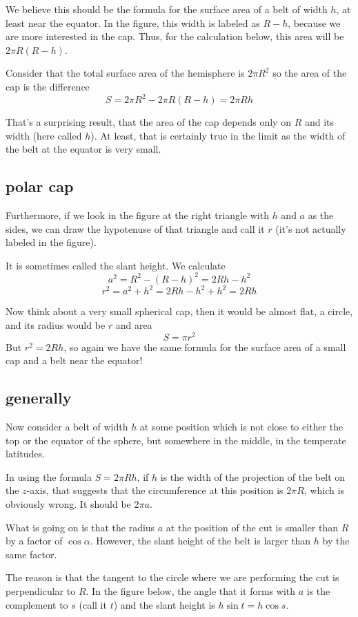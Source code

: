 \documentclass[11pt, oneside]{report}   	%
\begin{document}
We believe this should be the formula for the surface area of a belt of width $h$, at least near the equator.  In the figure, this width is labeled as $R-h$, because we are more interested in the cap.  Thus, for the calculation below, this area will be $2\pi R(R-h)$.

Consider that the total surface area of the hemisphere is $2\pi R^2$ so the area of the cap is the difference
\[ S = 2\pi R^2 -  2 \pi R (R-h) = 2 \pi Rh \]

That's a surprising result, that the area of the cap depends only on $R$ and its width (here called $h$).  At least, that is certainly true in the limit as the width of the belt at the equator is very small.

\subsection*{polar cap}
Furthermore, if we look in the figure at the right triangle with $h$ and $a$ as the sides, we can draw the hypotenuse of that triangle and call it $r$ (it's not actually labeled in the figure).  

It is sometimes called the slant height.  We calculate
\[ a^2 = R^2 - (R - h)^2 = 2 Rh - h^2 \]
\[ r^2 = a^2 + h^2 = 2 Rh - h^2 + h^2 = 2 Rh \]

Now think about a very small spherical cap, then it would be almost flat, a circle, and its radius would be $r$ and area
\[ S = \pi r^2 \]
But $r^2 = 2Rh$, so again we have the same formula for the surface area of a small cap and a belt near the equator!

\subsection*{generally}
Now consider a belt of width $h$ at some position which is not close to either the top or the equator of the sphere, but somewhere in the middle, in the temperate latitudes.

In using the formula $S = 2 \pi R h$, if $h$ is the width of the projection of the belt on the $z$-axis, that suggests that the circumference at this position is $2 \pi R$, which is obviously wrong.  It should be $2\pi a$.

What is going on is that the radius $a$ at the position of the cut is smaller than $R$ by a factor of $\cos \alpha$.  However, the slant height of the belt is larger than $h$ by the same factor.

The reason is that the tangent to the circle where we are performing the cut is perpendicular to $R$.  In the figure below, the angle that it forms with $a$ is the complement to $s$ (call it $t$) and the slant height is $h \sin t = h \cos s$.
\end{document}
